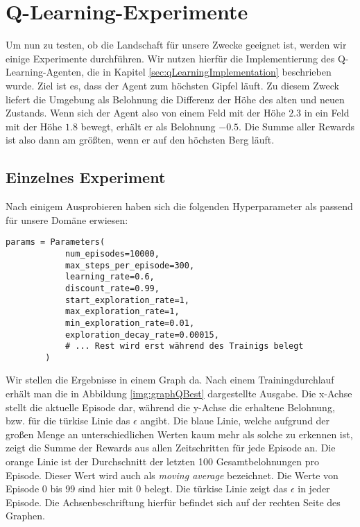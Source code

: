 \section{Q-Learning-Experimente} \label{sec:qLearningExperiments}

Um nun zu testen, ob die Landschaft für unsere Zwecke geeignet ist, werden wir einige Experimente durchführen. Wir nutzen hierfür die Implementierung des Q-Learning-Agenten, die in Kapitel \ref{sec:qLearningImplementation} beschrieben wurde. Ziel ist es, dass der Agent zum höchsten Gipfel läuft. Zu diesem Zweck liefert die Umgebung als Belohnung die Differenz der Höhe des alten und neuen Zustands. Wenn sich der Agent also von einem Feld mit der Höhe $ 2.3 $ in ein Feld mit der Höhe $ 1.8 $ bewegt, erhält er als Belohnung $ -0.5 $. Die Summe aller Rewards ist also dann am größten, wenn er auf den höchsten Berg läuft.

\subsection{Einzelnes Experiment}
Nach einigem Ausprobieren haben sich die folgenden Hyperparameter als passend für unsere Domäne erwiesen:
\begin{verbatim}
params = Parameters(
            num_episodes=10000,
            max_steps_per_episode=300,
            learning_rate=0.6,
            discount_rate=0.99,
            start_exploration_rate=1,
            max_exploration_rate=1,
            min_exploration_rate=0.01,
            exploration_decay_rate=0.00015,
            # ... Rest wird erst während des Trainigs belegt
        )
\end{verbatim}

Wir stellen die Ergebnisse in einem Graph da. Nach einem Trainingdurchlauf erhält man die in Abbildung \ref{img:graphQBest} dargestellte Ausgabe. Die x-Achse stellt die aktuelle Episode dar, während die y-Achse die erhaltene Belohnung, bzw. für die türkise Linie das $ \epsilon $ angibt. Die blaue Linie, welche aufgrund der großen Menge an unterschiedlichen Werten kaum mehr als solche zu erkennen ist, zeigt die Summe der Rewards aus allen Zeitschritten für jede Episode an. Die orange Linie ist der Durchschnitt der letzten 100 Gesamtbelohnungen pro Episode. Dieser Wert wird auch als \textit{moving average} bezeichnet. Die Werte von Episode 0 bis 99 sind hier mit 0 belegt. Die türkise Linie zeigt das $ \epsilon $ in jeder Episode. Die Achsenbeschriftung hierfür befindet sich auf der rechten Seite des Graphen.


